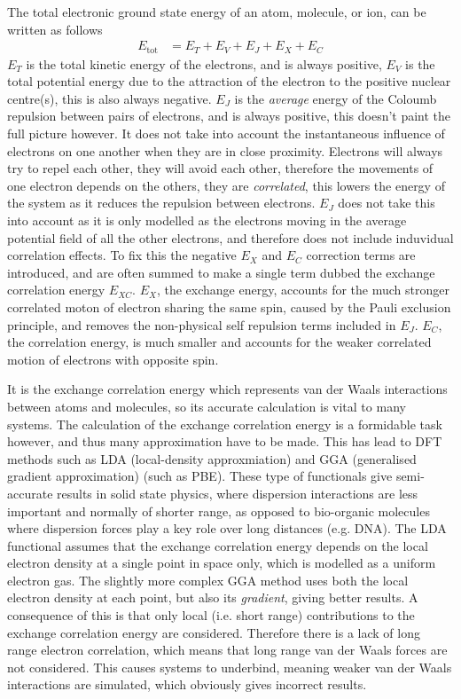 \documentclass[10pt,a4paper,twocolumn,twoside]{extarticle}
\begin{document}
	The total electronic ground state energy of an atom, molecule, or ion, can be written as follows
	\begin{align}
		E_\text{tot} &= E_T + E_V + E_J + E_X + E_C
	\end{align}
	$E_T$ is the total kinetic energy of the electrons, and is always positive, $E_V$ is the total potential energy due to the attraction of the electron to the positive nuclear centre(s), this is also always negative. $E_J$ is the \emph{average} energy of the Coloumb repulsion between pairs of electrons, and is always positive, this doesn't paint the full picture however. 
	It does not take into account the instantaneous influence of electrons on one another when they are in close proximity. Electrons will always try to repel each other, they will avoid each other, therefore the movements of one electron depends on the others, they are \emph{correlated}, this lowers the energy of the system as it reduces the repulsion between electrons. $E_J$ does not take this into account as it is only modelled as the electrons moving in the average potential field of all the other electrons, and therefore does not include induvidual correlation effects. 
	To fix this the negative $E_X$ and $E_C$ correction terms are introduced, and are often summed to make a single term dubbed the exchange correlation energy $E_{XC}$. 
	$E_X$, the exchange energy, accounts for the much stronger correlated moton of electron sharing the same spin, caused by the Pauli exclusion principle, and removes the non-physical self repulsion terms included in $E_J$. $E_C$, the correlation energy, is much smaller and accounts for the weaker correlated motion of electrons with opposite spin. 

	It is the exchange correlation energy which represents van der Waals interactions between atoms and molecules, so its accurate calculation is vital to many systems.
	The calculation of the exchange correlation energy is a formidable task however, and thus many approximation have to be made. This has lead to DFT methods such as LDA (local-density approxmiation)\cite{LDA-Kohn1965} and GGA (generalised gradient approximation)\cite{GGA-Becke1988,GGA-Perdew1986} (such as PBE\cite{PBE}). 
	These type of functionals give semi-accurate results in solid state physics, where dispersion interactions are less important and normally of shorter range, as opposed to bio-organic molecules where dispersion forces play a key role over long distances (e.g. DNA).\cite{vdWImportance-Kaplan2006} The LDA functional assumes that the exchange correlation energy depends on the local electron density at a single point in space only, which is modelled as a uniform electron gas.\cite{LDA-Kohn1965} The slightly more complex GGA method uses both the local electron density at each point, but also its \emph{gradient}, giving better results.\cite{GGA-Becke1988}\cite{GGA-Perdew1986} A consequence of this is that only local (i.e. short range) contributions to the exchange correlation energy are considered. Therefore there is a lack of long range electron correlation, which means that long range van der Waals forces are not considered. This causes systems to underbind, meaning weaker van der Waals interactions are simulated, which obviously gives incorrect results. 
\end{document}

